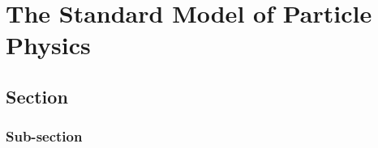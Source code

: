 
\chapter{The Standard Model of Particle Physics}
\section{Section}
\subsection{Sub-section}
\cite{Stewart-Tackmann:2012}


